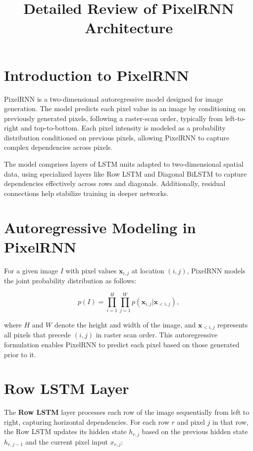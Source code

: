 \documentclass{article}
\title{Detailed Review of PixelRNN Architecture}
\author{}
\date{}
\begin{document}
\maketitle

\tableofcontents

\section{Introduction to PixelRNN}
PixelRNN is a two-dimensional autoregressive model designed for image generation. The model predicts each pixel value in an image by conditioning on previously generated pixels, following a raster-scan order, typically from left-to-right and top-to-bottom. Each pixel intensity is modeled as a probability distribution conditioned on previous pixels, allowing PixelRNN to capture complex dependencies across pixels.

The model comprises layers of LSTM units adapted to two-dimensional spatial data, using specialized layers like Row LSTM and Diagonal BiLSTM to capture dependencies effectively across rows and diagonals. Additionally, residual connections help stabilize training in deeper networks.

\section{Autoregressive Modeling in PixelRNN}
For a given image \( I \) with pixel values \( \mathbf{x}_{i,j} \) at location \( (i, j) \), PixelRNN models the joint probability distribution as follows:

\begin{equation}
    p(I) = \prod_{i=1}^H \prod_{j=1}^W p(\mathbf{x}_{i,j} | \mathbf{x}_{<i,j}),
\end{equation}

where \( H \) and \( W \) denote the height and width of the image, and \( \mathbf{x}_{<i,j} \) represents all pixels that precede \( (i, j) \) in raster scan order. This autoregressive formulation enables PixelRNN to predict each pixel based on those generated prior to it.

\section{Row LSTM Layer}
The \textbf{Row LSTM} layer processes each row of the image sequentially from left to right, capturing horizontal dependencies. For each row \( r \) and pixel \( j \) in that row, the Row LSTM updates its hidden state \( h_{r,j} \) based on the previous hidden state \( h_{r,j-1} \) and the current pixel input \( x_{r,j} \):
\end{document}
